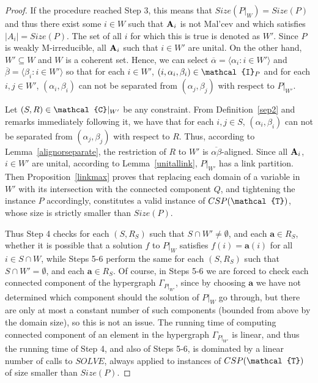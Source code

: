 \documentclass[11pt]{amsart}
\newcommand{\m}[1]{{\uppercase {\mathbf {#1}}}}
\newcommand{\vr}[1]{{\uppercase {\mathcal{#1}}}}
\newcommand{\lb}{\langle}
\newcommand{\rb}{\rangle}
\theoremstyle{definition}
\begin{document}
\begin{proof}
If the procedure reached Step 3, this means that $Size(P|_W)=Size(P)$ and thus there exist some $i\in W$ such that $\m A_i$ is not Mal'cev and which satisfies $|A_i|=Size(P)$. The set of all $i$ for which this is true is denoted as $W'$. Since $P$ is weakly M-irreducible, all $\m a_i$ such that $i\in W'$ are unital. On the other hand, $W'\subseteq W$ and $W$ is a coherent set. Hence, we can select $\overline{\alpha}=\lb\alpha_i:i\in W'\rb$ and $\overline{\beta}=\lb\beta_i:i\in W'\rb$ so that for each $i\in W'$, $(i,\alpha_i,\beta_i)\in\vr i_P$ and for each $i,j\in W'$, $(\alpha_i,\beta_i)$ can not be separated from $(\alpha_j,\beta_j)$ with respect to $P|_{W'}$.

Let $(S,R)\in\vr c|_{W'}$ be any constraint. From Definition~\ref{sep2} and remarks immediately following it, we have that for each $i,j\in S$, $(\alpha_i,\beta_i)$ can not be separated from $(\alpha_j,\beta_j)$ with respect to $R$. Thus, according to Lemma~\ref{alignorseparate}, the restriction of $R$ to $W'$ is $\overline{\alpha\beta}$-aligned. Since all $\m a_i$, $i\in W'$ are unital, according to Lemma~\ref{unitallink}, $P|_{W'}$ has a link partition. Then Proposition~\ref{linkmax} proves that replacing each domain of a variable in $W'$ with its intersection with the connected component $Q$, and tightening the instance $P$ accordingly, constitutes a valid instance of $CSP(\vr t)$, whose size is strictly smaller than $Size(P)$.

Thus Step 4 checks for each $(S,R_S)$ such that $S\cap W'\neq \emptyset$, and each $\mathbf{a}\in R_S$, whether it is possible that a solution $f$ to $P|_W$ satisfies $f(i)=\mathbf{a}(i)$ for all $i\in S\cap W$, while Steps 5-6 perform the same for each $(S,R_S)$ such that $S\cap W'=\emptyset$, and each $\mathbf{a}\in R_S$. Of course, in Steps 5-6 we are forced to check each connected component of the hypergraph $\Gamma_{P|_{W'}}$, since by choosing $\mathbf{a}$ we have not determined which component should the solution of $P|_W$ go through, but there are only at most a constant number of such components (bounded from above by the domain size), so this is not an issue. The running time of computing connected component of an element in the hypergraph $\Gamma_{P|_{W'}}$ is linear, and thus the running time of Step 4, and also of Steps 5-6, is dominated by a linear number of calls to $SOLVE$, always applied to instances of $CSP(\vr t)$ of size smaller than $Size(P)$.
\end{proof}

\end{document}
